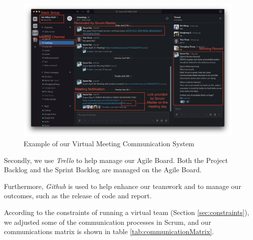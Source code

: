 \documentclass{report}
\begin{document}
\begin{figure}[htp]
\centering
\includegraphics[width=\textwidth]{Figures/meeting.png}
\caption{Example of our Virtual Meeting Communication System}
\label{fig:meeting}
\end{figure}

Secondly, we use \textit{Trello} to help manage our Agile Board. Both the Project Backlog and the Sprint Backlog are managed on the Agile Board.

Furthermore, \textit{Github} is used to help enhance our teamwork and to manage our outcomes, such as the release of code and report.

According to the constraints of running a virtual team (Section \ref{sec:constraints}), we adjusted some of the communication processes in Scrum, and our communications matrix is shown in table \ref{tab:communicationMatrix}. 
\\
\end{document}
